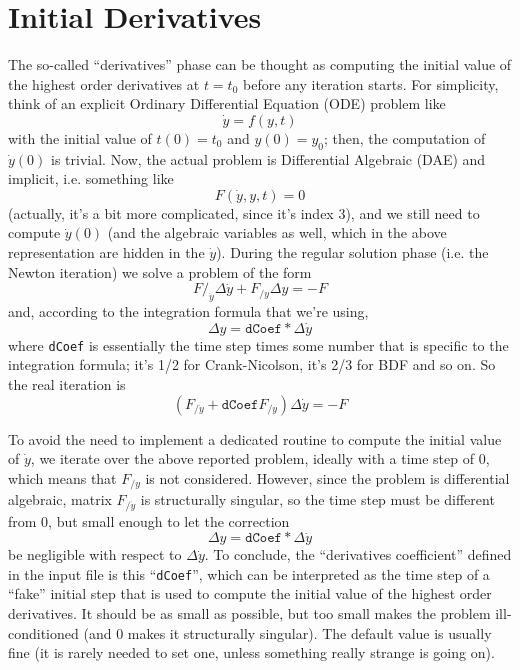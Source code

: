 \documentclass[10pt,dvips,fleqn,subeqn]{report}
\begin{document}
\section{Initial Derivatives}
The so-called ``derivatives'' phase can be thought as computing
the initial value of the highest order derivatives at $t=t_0$
before any iteration starts.
For simplicity, think of an explicit Ordinary Differential Equation
(ODE) problem like
\begin{equation}
  \dot{y} = f(y, t)
\end{equation}
with the initial value of $t(0) = t_0$ and $y(0) = y_0$; 
then, the computation of $\dot{y}(0)$ is trivial.  
Now, the actual problem is Differential Algebraic (DAE) and implicit, 
i.e. something like
\begin{equation}
  F(\dot{y}, y, t) = 0
\end{equation}
(actually, it's a bit more complicated, since it's index 3), 
and we still need to compute $\dot{y}(0)$ 
(and the algebraic variables as well, 
which in the above representation are hidden in the $\dot{y}$).
During the regular solution phase (i.e. the Newton iteration) 
we solve a problem of the form
\begin{equation}
  F/_{\dot{y}} \Delta \dot{y} + F_{/y} \Delta y = - F
\end{equation}
and, according to the integration formula that we're using,
\begin{equation}
  \Delta y = \texttt{dCoef} * \Delta \dot{y}
\end{equation}
where \texttt{dCoef} is essentially the time step times some number that is specific to the integration formula; it's 1/2 for Crank-Nicolson, it's 2/3 for BDF and so on.
So the real iteration is
\begin{equation}
  ( F_{/\dot{y}} + \texttt{dCoef} F_{/y} ) \Delta \dot{y} = - F
\end{equation}

To avoid the need to implement a dedicated routine to compute 
the initial value of $\dot{y}$, we iterate over the above reported problem, 
ideally with a time step of $0$, which means that $F_{/y}$ is not considered.  
However, since the problem is differential algebraic, 
matrix $F_{/\dot{y}}$ is structurally singular, so the time step 
must be different from $0$, but small enough to let the correction
\begin{equation}
	\Delta y = \texttt{dCoef} * \Delta \dot{y}
	\label{eq:dcoef}
\end{equation}
be negligible with respect to $\Delta \dot{y}$.  
To conclude, the ``derivatives coefficient'' defined in the input file 
is this ``\texttt{dCoef}'', 
which can be interpreted as the time step of a ``fake'' 
initial step that is used to compute the initial value of 
the highest order derivatives.  
It should be as small as possible, but too small makes 
the problem ill-conditioned (and $0$ makes it structurally singular).  
The default value is usually fine 
(it is rarely needed to set one, unless something 
really strange is going on).\\
\end{document}
